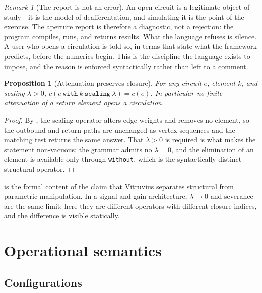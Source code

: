 \documentclass[11pt,twocolumn,a4paper]{article}
\theoremstyle{thmstyle}
\newtheorem{proposition}[theorem]{Proposition}
\theoremstyle{definition}
\theoremstyle{remark}
\newtheorem{remark}[theorem]{Remark}
\begin{document}
\begin{remark}[The report is not an error]
\label{rem:report-not-error}
An open circuit is a legitimate object of study---it is the model of
deafferentation, and simulating it is the point of the exercise. The aperture
report is therefore a diagnostic, not a rejection: the program compiles, runs,
and returns results. What the language refuses is silence. A user who opens a
circulation is told so, in terms that state what the framework predicts, before
the numerics begin. This is the discipline the language exists to impose, and
the reason  is enforced syntactically rather than left to
a comment.
\end{remark}

\begin{proposition}[Attenuation preserves closure]
\label{prop:attenuation}
For any circuit $e$, element $k$, and scaling $\lambda>0$,
$c(e\ \texttt{with}\ k\ \texttt{scaling}\ \lambda)=c(e)$. In particular no
finite attenuation of a return element opens a circulation.
\end{proposition}

\begin{proof}
By , the scaling operator alters edge weights and
removes no element, so the outbound and return paths are unchanged as vertex
sequences and the matching test returns the same answer. That $\lambda>0$ is
required is what makes the statement non-vacuous: the grammar admits no
$\lambda=0$, and the elimination of an element is available only through
\texttt{without}, which is the syntactically distinct structural operator.
\end{proof}

 is the formal content of the claim that Vitruvius
separates structural from parametric manipulation. In a signal-and-gain
architecture, $\lambda\to0$ and severance are the same limit; here they are
different operators with different closure indices, and the difference is
visible statically.

\section{Operational semantics}
\label{sec:semantics}

\subsection{Configurations}
\end{document}
